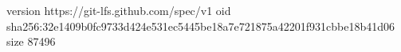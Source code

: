 version https://git-lfs.github.com/spec/v1
oid sha256:32e1409b0fc9733d424e531ec5445be18a7e721875a42201f931cbbe18b41d06
size 87496
